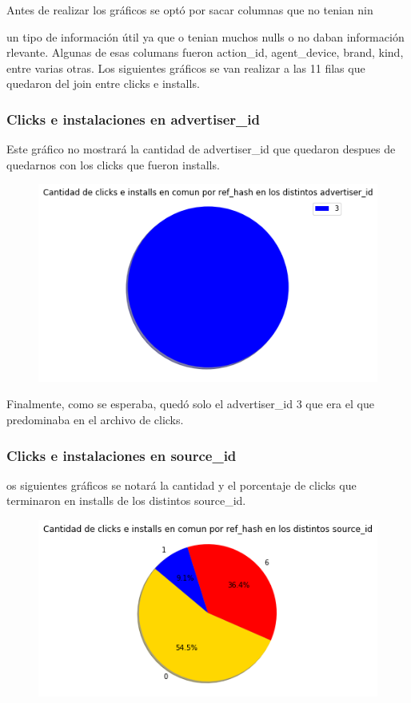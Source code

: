 \documentclass[a4paper, 12pt]{article}
\begin{document}
	 Antes de realizar los gráficos se optó por sacar columnas que no tenian nin{un tipo de información útil ya que o tenian muchos nulls o no daban información rlevante. Algunas de esas columans fueron action\_id, agent\_device, brand, kind, entre varias otras. Los siguientes gráficos se van realizar a las 11 filas que quedaron del join entre clicks e installs.	 

	\subsubsection{Clicks e instalaciones en advertiser\_id}
	Este gráfico no mostrará la cantidad de advertiser\_id que quedaron despues de quedarnos con los clicks que fueron installs.
	
	
		\begin{figure}[H]
			\centering
			\includegraphics[width=\textwidth]{images/clicks-installs/advertiser_id.png}
			\caption{}
		\end{figure}
	
		
	Finalmente, como se esperaba, quedó solo el advertiser\_id 3 que era el que predominaba en el archivo de clicks.
	
	\subsubsection{Clicks e instalaciones en source\_id}
	os siguientes gráficos se notará la cantidad y el porcentaje de clicks que terminaron en installs de los distintos source\_id.
	
	
		\begin{figure}[H]
			\centering
			\includegraphics[width=\textwidth]{images/clicks-installs/source_id.png}
			\caption{}
		\end{figure}
	
}
\end{document}
